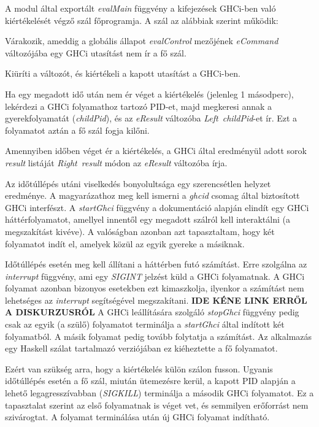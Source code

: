 A modul által exportált \textit{evalMain} függvény a kifejezések GHCi-ben való kiértékelését végző szál főprogramja. A szál az alábbiak szerint működik:

\begin{compactenum}
	\item Várakozik, ameddig a globális állapot \textit{evalControl} mezőjének \textit{eCommand} változójába egy GHCi utasítást nem ír a fő szál.
	\item Kiüríti a változót, és kiértékeli a kapott utasítást a GHCi-ben.
	\item Ha egy megadott idő után nem ér véget a kiértékelés (jelenleg 1 másodperc), lekérdezi a GHCi folyamathoz tartozó PID-et, majd megkeresi annak a gyerekfolyamatát (\textit{childPid}), és az \textit{eResult} változóba \textit{Left\ childPid}-et ír. Ezt a folyamatot aztán a fő szál fogja kilőni.
	\item Amennyiben időben véget ér a kiértékelés, a GHCi által eredményül adott sorok \textit{result} listáját \textit{Right\ result} módon az \textit{eResult} változóba írja.
\end{compactenum}

Az időtúllépés utáni viselkedés bonyolultsága egy szerencsétlen helyzet eredménye. A magyarázathoz meg kell ismerni a \textit{ghcid} csomag által biztosított GHCi interfészt. A \textit{startGhci} függvény a dokumentáció alapján elindít egy GHCi háttérfolyamatot, amellyel innentől egy megadott szálról kell interaktálni (a megszakítást kivéve). A valóságban azonban azt tapasztaltam, hogy két folyamatot indít el, amelyek közül az egyik gyereke a másiknak. 

Időtúllépés esetén meg kell állítani a háttérben futó számítást. Erre szolgálna az \textit{interrupt} függvény, ami egy \textit{SIGINT} jelzést küld a GHCi folyamatnak. A GHCi folyamat azonban bizonyos esetekben ezt kimaszkolja, ilyenkor a számítást nem lehetséges az \textit{interrupt} segítségével megszakítani. \textbf{IDE KÉNE LINK ERRŐL A DISKURZUSRÓL} A GHCi leállítására szolgáló \textit{stopGhci} függvény pedig csak  az egyik (a szülő) folyamatot terminálja a \textit{startGhci} által indított két folyamatból. A másik folyamat pedig tovább folytatja a számítást. Az alkalmazás egy Haskell szálat tartalmazó verziójában ez kiéheztette a fő folyamatot. 

Ezért van szükség arra, hogy a kiértékelés külön szálon fusson. Ugyanis időtúllépés esetén a fő szál, miután ütemezésre kerül, a kapott PID alapján a lehető legagresszívabban (\textit{SIGKILL}) terminálja a második GHCi folyamatot. Ez a tapasztalat szerint az első folyamatnak is véget vet, és semmilyen erőforrást nem szivárogtat. A folyamat terminálása után új GHCi folyamat indítható.

